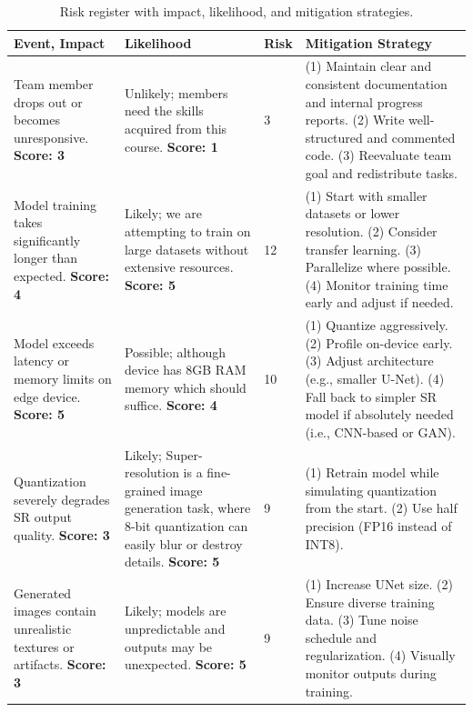 \documentclass{article} %
\begin{document}
\begin{table}[h!]
\centering
\caption{Risk register with impact, likelihood, and mitigation strategies.}
\renewcommand{\arraystretch}{1.2} %
\setlength{\tabcolsep}{6pt}       %
\begin{tabularx}{\textwidth}{|>{\raggedright\arraybackslash}X|>{\raggedright\arraybackslash}X|>{\centering\arraybackslash}p{0.5cm}|>{\raggedright\arraybackslash}p{6cm}|}
\hline
\textbf{Event, Impact} & \textbf{Likelihood} & \textbf{Risk} & \textbf{Mitigation Strategy} \\
\hline

Team member drops out or becomes unresponsive. \textbf{Score: 3} &
Unlikely; members need the skills acquired from this course. \textbf{Score: 1} &
\cellcolor{risklow}3 &
(1) Maintain clear and consistent documentation and internal progress reports. (2) Write well-structured and commented code. (3) Reevaluate team goal and redistribute tasks. \\
\hline

Model training takes significantly longer than expected. \textbf{Score: 4} &
Likely; we are attempting to train on large datasets without extensive resources. \textbf{Score: 5} &
\cellcolor{riskhigh}12 &
(1) Start with smaller datasets or lower resolution. (2) Consider transfer learning. (3) Parallelize where possible. (4) Monitor training time early and adjust if needed. \\
\hline

Model exceeds latency or memory limits on edge device. \textbf{Score: 5} &
Possible; although device has 8GB RAM memory which should suffice. \textbf{Score: 4} &
\cellcolor{riskhigh}10 &
(1) Quantize aggressively. (2) Profile on-device early. (3) Adjust architecture (e.g., smaller U-Net). (4) Fall back to simpler SR model if absolutely needed (i.e., CNN-based or GAN). \\
\hline

Quantization severely degrades SR output quality. \textbf{Score: 3} &
Likely; Super-resolution is a fine-grained image generation task, where 8-bit quantization can easily blur or destroy details. \textbf{Score: 5} &
\cellcolor{riskmed}9 &
(1) Retrain model while simulating quantization from the start. (2) Use half precision (FP16 instead of INT8). \\
\hline

Generated images contain unrealistic textures or artifacts. \textbf{Score: 3} &
Likely; models are unpredictable and outputs may be unexpected. \textbf{Score: 5} &
\cellcolor{riskmed}9 &
(1) Increase UNet size. (2) Ensure diverse training data. (3) Tune noise schedule and regularization. (4) Visually monitor outputs during training. \\
\hline


\end{tabularx}
\end{table}
\end{document}
